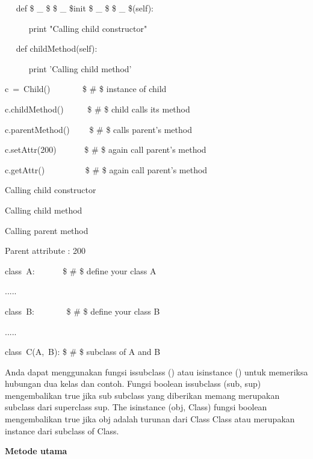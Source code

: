 \begin{12pt}
\begin{12pt}
\begin{12pt}
\begin{12pt}
\begin{12pt}
\begin{12pt}
\begin{12pt}
\begin{12pt}
\begin{12pt}
\begin{12pt}
\begin{12pt}
\begin{12pt}
\begin{12pt}
\begin{12pt}
\begin{12pt}
\begin{12pt}
\begin{12pt}
\begin{12pt}
\begin{12pt}
\noindent 
~~ def  \$  \_  \$ \$  \_  \$init \$  \_  \$ \$  \_  \$(self): \par
\noindent 
~~~~~ print "Calling child constructor" \par
\vspace{12pt}
\noindent 
~~ def childMethod(self): \par
\noindent 
~~~~~ print 'Calling child method' \par
\vspace{12pt}
\noindent 
c~=~Child()~~~~~~~    \$  \#  \$ instance of child \par
\noindent 
c.childMethod()~~~~~  \$  \#  \$ child calls its method \par
\noindent 
c.parentMethod()~~~~  \$  \#  \$ calls parent's method \par
\noindent 
c.setAttr(200)~~~~~~  \$  \#  \$ again call parent's method \par
\noindent 
c.getAttr()~~~~~~~~~  \$  \#  \$ again call parent's method \par
\vspace{12pt}
\noindent 
Calling child constructor \par
\noindent 
Calling child method \par
\noindent 
Calling parent method \par
\noindent 
Parent attribute : 200 \par
\vspace{12pt}
\noindent 
class~A:~~~~~~   \$  \#  \$ define your class A \par
\noindent 
..... \par
\vspace{12pt}
\noindent 
class~B:~~~~~~~   \$  \#  \$ define your class B \par
\noindent 
..... \par
\vspace{12pt}
\noindent 
class~C(A,~B):    \$  \#  \$ subclass of A and B \par
\vspace{12pt}
Anda dapat menggunakan fungsi issubclass () atau isinstance () untuk memeriksa hubungan dua kelas dan contoh. Fungsi boolean issubclass (sub, sup) mengembalikan true jika sub subclass yang diberikan memang merupakan subclass dari superclass sup. The isinstance (obj, Class) fungsi boolean mengembalikan true jika obj adalah turunan dari Class Class atau merupakan instance dari subclass of Class. \par
\vspace{12pt}
\noindent 
{\fontsize{14pt}{14pt}\selectfont \textbf{Metode utama} \\} \par

\end{12pt}
\end{12pt}
\end{12pt}
\end{12pt}
\end{12pt}
\end{12pt}
\end{12pt}
\end{12pt}
\end{12pt}
\end{12pt}
\end{12pt}
\end{12pt}
\end{12pt}
\end{12pt}
\end{12pt}
\end{12pt}
\end{12pt}
\end{12pt}
\end{12pt}
